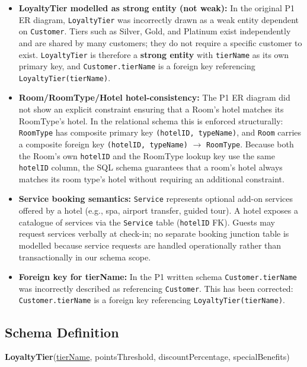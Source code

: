 \documentclass[12pt,letterpaper]{article}
\begin{document}
\begin{itemize}
    \item \textbf{LoyaltyTier modelled as strong entity (not weak):} In the original P1 ER diagram, \texttt{LoyaltyTier} was incorrectly drawn as a weak entity dependent on \texttt{Customer}. Tiers such as Silver, Gold, and Platinum exist independently and are shared by many customers; they do not require a specific customer to exist. \texttt{LoyaltyTier} is therefore a \textbf{strong entity} with \texttt{tierName} as its own primary key, and \texttt{Customer.tierName} is a foreign key referencing \texttt{LoyaltyTier(tierName)}.

    \item \textbf{Room/RoomType/Hotel hotel-consistency:} The P1 ER diagram did not show an explicit constraint ensuring that a Room's hotel matches its RoomType's hotel. In the relational schema this is enforced structurally: \texttt{RoomType} has composite primary key \texttt{(hotelID, typeName)}, and \texttt{Room} carries a composite foreign key \texttt{(hotelID, typeName)} $\rightarrow$ \texttt{RoomType}. Because both the Room's own \texttt{hotelID} and the RoomType lookup key use the same \texttt{hotelID} column, the SQL schema guarantees that a room's hotel always matches its room type's hotel without requiring an additional constraint.

    \item \textbf{Service booking semantics:} \texttt{Service} represents optional add-on services offered by a hotel (e.g., spa, airport transfer, guided tour). A hotel exposes a catalogue of services via the \texttt{Service} table (\texttt{hotelID} FK). Guests may request services verbally at check-in; no separate booking junction table is modelled because service requests are handled operationally rather than transactionally in our schema scope.

    \item \textbf{Foreign key for tierName:} In the P1 written schema \texttt{Customer.tierName} was incorrectly described as referencing \texttt{Customer}. This has been corrected: \texttt{Customer.tierName} is a foreign key referencing \texttt{LoyaltyTier(tierName)}.
\end{itemize}

\subsection*{Schema Definition}

\textbf{LoyaltyTier}(\underline{tierName}, pointsThreshold, discountPercentage, specialBenefits)
\end{document}
